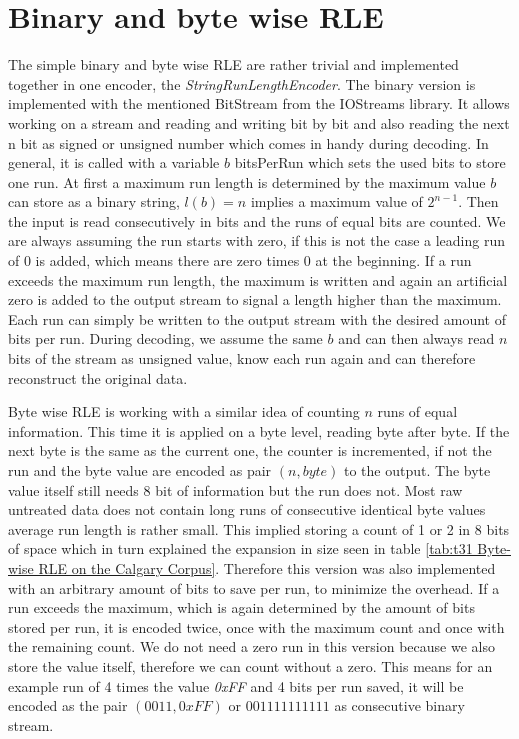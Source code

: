 \section{Binary and byte wise RLE}
\label{ch:Implementation:bin and byte rle}
\par{
	The simple binary and byte wise RLE are rather trivial and implemented together in one encoder, the \textit{StringRunLengthEncoder}. The binary version is implemented with the mentioned BitStream from the IOStreams library. It allows working on a stream and reading and writing bit by bit and also reading the next n bit as signed or unsigned number which comes in handy during decoding. In general, it is called with a variable $b$ bitsPerRun which sets the used bits to store one run. At first a maximum run length is determined by the maximum value $b$ can store as a binary string, $l(b) = n$ implies a maximum value of $2^{n-1}$. Then the input is read consecutively in bits and the runs of equal bits are counted. We are always assuming the run starts with zero, if this is not the case a leading run of 0 is added, which means there are zero times 0 at the beginning. If a run exceeds the maximum run length, the maximum is written and again an artificial zero is added to the output stream to signal a length higher than the maximum. Each run can simply be written to the output stream with the desired amount of bits per run. During decoding, we assume the same $b$ and can then always read $n$ bits of the stream as unsigned value, know each run again and can therefore reconstruct the original data.
}
\par{
	Byte wise RLE is working with a similar idea of counting $n$ runs of equal information. This time it is applied on a byte level, reading byte after byte. If the next byte is the same as the current one, the counter is incremented, if not the run and the byte value are encoded as pair $(n, byte)$ to the output. The byte value itself still needs 8 bit of information but the run does not. Most raw untreated data does not contain long runs of consecutive identical byte values average run length is rather small. This implied storing a count of 1 or 2 in 8 bits of space which in turn explained the expansion in size seen in table \ref{tab:t31 Byte-wise RLE on the Calgary Corpus}. Therefore this version was also implemented with an arbitrary amount of bits to save per run, to minimize the overhead. If a run exceeds the maximum, which is again determined by the amount of bits stored per run, it is encoded twice, once with the maximum count and once with the remaining count. We do not need a zero run in this version because we also store the value itself, therefore we can count without a zero. This means for an example run of 4 times the value \textit{0xFF} and 4 bits per run saved, it will be encoded as the pair $(0011,0xFF)$ or $001111111111$ as consecutive binary stream.
}
